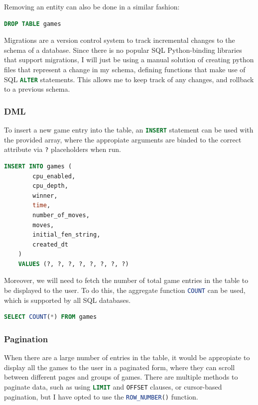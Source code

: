 \documentclass[../main/main.tex]{subfiles}
\begin{document}
\noindent Removing an entity can also be done in a similar fashion:

\begin{lstlisting}[language=SQL, frame=single]
    DROP TABLE games
\end{lstlisting}

Migrations are a version control system to track incremental changes to the schema of a database. Since there is no popular SQL Python-binding libraries that support migrations, I will just be using a manual solution of creating python files that represent a change in my schema, defining functions that make use of SQL \lstinline[language=SQL]{ALTER} statements. This allows me to keep track of any changes, and rollback to a previous schema.

\subsubsection*{DML}
To insert a new game entry into the table, an \lstinline[language=SQL]{INSERT} statement can be used with the provided array, where the appropiate arguments are binded to the correct attribute via \lstinline[language=Python]{?} placeholders when run.

\begin{lstlisting}[language=SQL, frame=single]
    INSERT INTO games (
        cpu_enabled,
        cpu_depth,
        winner,
        time,
        number_of_moves,
        moves,
        initial_fen_string,
        created_dt
    )
    VALUES (?, ?, ?, ?, ?, ?, ?, ?)
\end{lstlisting}

Moreover, we will need to fetch the number of total game entries in the table to be displayed to the user. To do this, the aggregate function \lstinline[language=SQL]{COUNT} can be used, which is supported by all SQL databases.

\begin{lstlisting}[language=SQL, frame=single]
    SELECT COUNT(*) FROM games
\end{lstlisting}

\subsubsection*{Pagination}
When there are a large number of entries in the table, it would be appropiate to display all the games to the user in a paginated form, where they can scroll between different pages and groups of games. There are multiple methods to paginate data, such as using \lstinline[language=SQL]{LIMIT} and \lstinline[language=SQL]{OFFSET} clauses, or cursor-based pagination, but I have opted to use the \lstinline[language=SQL]{ROW_NUMBER()} function.
\end{document}
